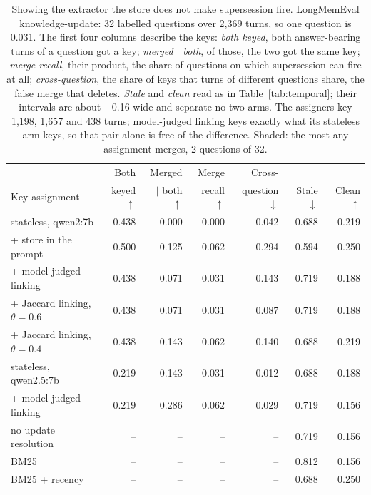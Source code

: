 \documentclass{article} %
\begin{document}
\begin{table}[t]
\centering
\small
\setlength{\tabcolsep}{4pt}
\begin{tabular}{@{}lrrrrrr@{}}
\toprule
 & Both & Merged & Merge & Cross- & & \\
Key assignment & keyed $\uparrow$ & $\mid$ both $\uparrow$ & recall $\uparrow$ & question $\downarrow$ & Stale $\downarrow$ & Clean $\uparrow$ \\
\midrule
stateless, qwen2:7b & 0.438 & 0.000 & 0.000 & 0.042 & 0.688 & 0.219 \\
\quad + store in the prompt & 0.500 & 0.125 & \cellcolor{cPos!60}0.062 & 0.294 & 0.594 & 0.250 \\
\quad + model-judged linking & 0.438 & 0.071 & 0.031 & 0.143 & 0.719 & 0.188 \\
\quad + Jaccard linking, $\theta{=}0.6$ & 0.438 & 0.071 & 0.031 & 0.087 & 0.719 & 0.188 \\
\quad + Jaccard linking, $\theta{=}0.4$ & 0.438 & 0.143 & \cellcolor{cPos!60}0.062 & 0.140 & 0.688 & 0.219 \\
\midrule
stateless, qwen2.5:7b & 0.219 & 0.143 & 0.031 & 0.012 & 0.688 & 0.188 \\
\quad + model-judged linking & 0.219 & 0.286 & \cellcolor{cPos!60}0.062 & 0.029 & 0.719 & 0.156 \\
\midrule
no update resolution & -- & -- & -- & -- & 0.719 & 0.156 \\
BM25 & -- & -- & -- & -- & 0.812 & 0.156 \\
BM25 + recency & -- & -- & -- & -- & 0.688 & 0.250 \\
\bottomrule
\end{tabular}
\caption{Showing the extractor the store does not make supersession fire. LongMemEval knowledge-update: 32 labelled questions over 2{,}369 turns, so one question is 0.031. The first four columns describe the keys: \emph{both keyed}, both answer-bearing turns of a question got a key; \emph{merged $\mid$ both}, of those, the two got the same key; \emph{merge recall}, their product, the share of questions on which supersession can fire at all; \emph{cross-question}, the share of keys that turns of different questions share, the false merge that deletes. \emph{Stale} and \emph{clean} read as in Table~\ref{tab:temporal}; their intervals are about $\pm$0.16 wide and separate no two arms. The assigners key 1{,}198, 1{,}657 and 438 turns; model-judged linking keys exactly what its stateless arm keys, so that pair alone is free of the difference. Shaded: the most any assignment merges, 2 questions of 32.}
\label{tab:lme}
\end{table}
\end{document}
